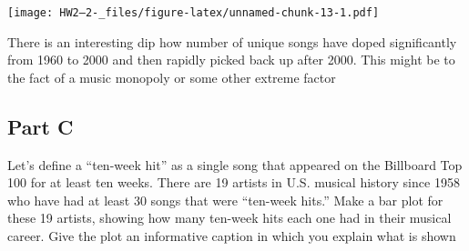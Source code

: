 \documentclass[
]{article}
\begin{document}
\texttt{[image: HW2--2-\_files/figure-latex/unnamed-chunk-13-1.pdf]}

There is an interesting dip how number of unique songs have doped
significantly from 1960 to 2000 and then rapidly picked back up after
2000. This might be to the fact of a music monopoly or some other
extreme factor

\hypertarget{part-c-2}{%
\subsection{Part C}\label{part-c-2}}

Let's define a ``ten-week hit'' as a single song that appeared on the
Billboard Top 100 for at least ten weeks. There are 19 artists in U.S.
musical history since 1958 who have had at least 30 songs that were
``ten-week hits.'' Make a bar plot for these 19 artists, showing how
many ten-week hits each one had in their musical career. Give the plot
an informative caption in which you explain what is shown

\hypertarget{section}{%
\subsection{}\label{section}}
\end{document}
